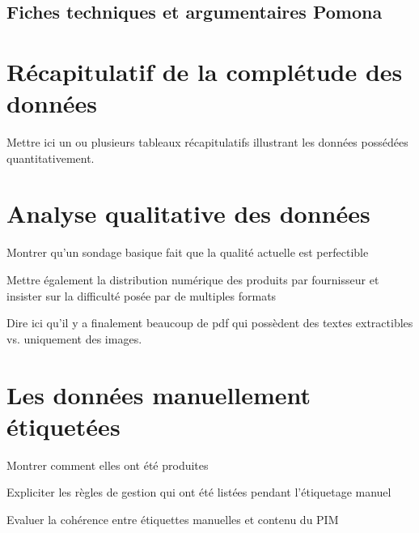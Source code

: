             \subsection{Fiches techniques et argumentaires Pomona}
        \section{Récapitulatif de la complétude des données}

        Mettre ici un ou plusieurs tableaux récapitulatifs illustrant les données possédées quantitativement.

        \section{Analyse qualitative des données}
        
        Montrer qu'un sondage basique fait que la qualité actuelle est perfectible

        Mettre également la distribution numérique des produits par fournisseur et insister sur la difficulté posée par de multiples formats

        Dire ici qu'il y a finalement beaucoup de pdf qui possèdent des textes extractibles vs. uniquement des images.

        \section{Les données \og manuellement étiquetées \fg}

        Montrer comment elles ont été produites

        Expliciter les règles de gestion qui ont été listées pendant l'étiquetage manuel

        Evaluer la cohérence entre étiquettes manuelles et contenu du PIM
